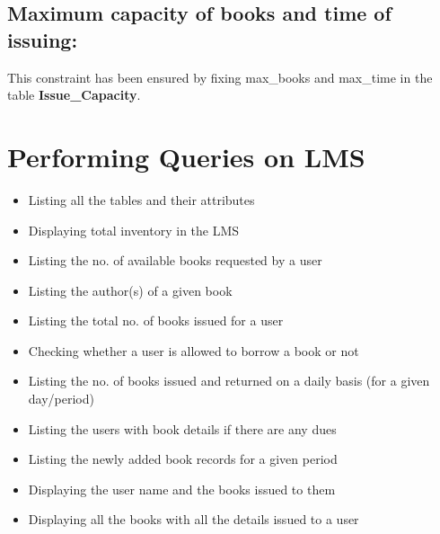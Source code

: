 \documentclass{article}
\begin{document}
\subsection{Maximum capacity of books and time of issuing:} 
This constraint has been ensured by fixing {\color{green}max\_books} and {\color{green}max\_time} in the table \textbf{\color{green}Issue\_Capacity}.

\section{Performing Queries on LMS}
\begin{itemize}
    \item Listing all the tables and their attributes
    \item Displaying total inventory in the LMS
    \item Listing the no. of available books requested by a user
    \item Listing the author(s) of a given book
    \item Listing the total no. of books issued for a user
    \item Checking whether a user is allowed to borrow a book or not
    \item Listing the no. of books issued and returned on a daily basis (for a given day/period)
    \item Listing the users with book details if there are any dues
    \item Listing the newly added book records for a given period
    \item Displaying the user name and the books issued to them
    \item Displaying all the books with all the details issued to a user
\end{itemize}
\end{document}
